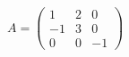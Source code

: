 \documentclass[preview]{standalone}
\begin{document}
\begin{align*}
A = \begin{pmatrix} 1 & 2 & 0 \\ -1 & 3 & 0 \\ 0 & 0 & -1 \end{pmatrix}
\end{align*}
\end{document}

